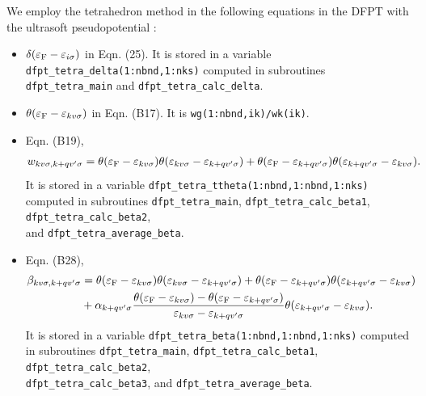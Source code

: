 \documentclass[12pt]{article}
\begin{document}
We employ the tetrahedron method in the following equations in the DFPT with 
the ultrasoft pseudopotential \cite{DFPT-US}:
\begin{itemize}

\item $\delta(\varepsilon_{\rm F} - \varepsilon_{i \sigma})$ in Eqn. (25).
It is stored in a variable \verb|dfpt_tetra_delta(1:nbnd,1:nks)|
computed in subroutines \verb|dfpt_tetra_main| and \verb|dfpt_tetra_calc_delta|.

\item $\theta(\varepsilon_{\rm F} - \varepsilon_{k v \sigma})$ in Eqn. (B17).
It is \verb|wg(1:nbnd,ik)/wk(ik)|.

\item Eqn. (B19), 
  \begin{align}
    w_{k v \sigma, k+q v' \sigma} = 
    \theta(\varepsilon_{\rm F} - \varepsilon_{k v \sigma})
    \theta(\varepsilon_{k v \sigma} - \varepsilon_{k+q v' \sigma})
    +
    \theta(\varepsilon_{\rm F} - \varepsilon_{k+q v' \sigma})
    \theta(\varepsilon_{k+q v' \sigma} - \varepsilon_{k v \sigma}).
  \end{align}
  It is stored in a variable \verb|dfpt_tetra_ttheta(1:nbnd,1:nbnd,1:nks)|
  computed in subroutines \verb|dfpt_tetra_main|, \verb|dfpt_tetra_calc_beta1|, 
  \verb|dfpt_tetra_calc_beta2|, \\
  and \verb|dfpt_tetra_average_beta|.

\item Eqn. (B28), 
  \begin{align}
    \beta_{k v \sigma, k+q v' \sigma} &= 
    \theta(\varepsilon_{\rm F} - \varepsilon_{k v \sigma})
    \theta(\varepsilon_{k v \sigma} - \varepsilon_{k+q v' \sigma})
    +
    \theta(\varepsilon_{\rm F} - \varepsilon_{k+q v' \sigma})
    \theta(\varepsilon_{k+q v' \sigma} - \varepsilon_{k v \sigma})
    \nonumber \\
    &+ \alpha_{k+q v' \sigma} 
    \frac{\theta(\varepsilon_{\rm F} - \varepsilon_{k v \sigma})
      - \theta(\varepsilon_{\rm F} - \varepsilon_{k+q v' \sigma})}
         {\varepsilon_{k v \sigma} - \varepsilon_{k+q v' \sigma}}
         \theta(\varepsilon_{k+q v' \sigma} - \varepsilon_{k v \sigma}).
  \end{align}
  It is stored in a variable \verb|dfpt_tetra_beta(1:nbnd,1:nbnd,1:nks)|
  computed in subroutines \verb|dfpt_tetra_main|, \verb|dfpt_tetra_calc_beta1|, 
  \verb|dfpt_tetra_calc_beta2|, \\ \verb|dfpt_tetra_calc_beta3|, 
  and \verb|dfpt_tetra_average_beta|.

\end{itemize}
\end{document}
